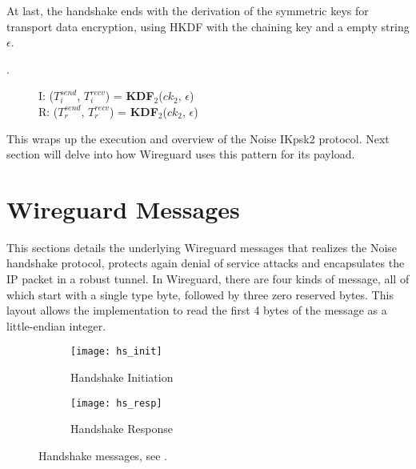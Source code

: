   At last, the handshake ends with the derivation of the symmetric keys for transport data encryption,
  using HKDF with the chaining key and a empty string $\epsilon$.
    \begin{center}
      \begin{varwidth}{\textwidth}
        \begin{description}
        \item[\textnormal{}.] 
              I: ($T^{send}_i$, $T^{recv}_i$) = \textbf{KDF}$_2$($ck_2$, $\epsilon$) \\
              R: ($T^{send}_r$, $T^{recv}_r$) = \textbf{KDF}$_2$($ck_2$, $\epsilon$)
        \addtocounter{cnt}{1}
        \end{description}
      \end{varwidth}
    \end{center}

  This wraps up the execution and overview of the Noise IKpsk2 protocol. Next section will delve 
  into how Wireguard uses this pattern for its payload.

\section{Wireguard Messages} \label{w3}
    This sections details the underlying Wireguard messages that realizes the Noise handshake protocol,
    protects again denial of service attacks and encapsulates the IP packet in a robust tunnel. In  
    Wireguard, there are four kinds of message, all of which start with a single type byte, followed
    by three zero reserved bytes. This layout allows the implementation to read the first 4 bytes
    of the message as a little-endian integer. 
    
    \begin{figure}[h]
      \centering
      \begin{subfigure}[b]{0.6\textwidth}
          \centering
          \texttt{[image: hs\_init]}
          \caption{Handshake Initiation}
          \label{fig:hsinit}
      \end{subfigure}
      \hfill
      \begin{subfigure}[b]{0.6\textwidth}
          \centering
          \texttt{[image: hs\_resp]}
          \caption{Handshake Response}
          \label{fig:hsresp}
      \end{subfigure}
      \caption{Handshake messages, see \cite[p.~10]{wireguard}.}
      \label{fig:hs}
    \end{figure} 

